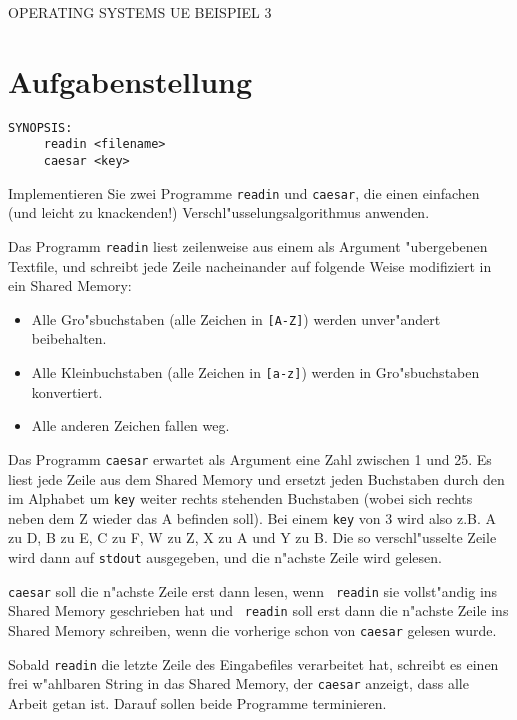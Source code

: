 \documentclass{article}
\begin{document}
\begin{center}
\begin{Large}
OPERATING SYSTEMS UE BEISPIEL 3
\end{Large}
\end{center}



\section*{Aufgabenstellung}

\begin{verbatim}
SYNOPSIS:
     readin <filename>
     caesar <key>
\end{verbatim} 

Implementieren Sie zwei Programme {\tt readin} und {\tt caesar}, die
einen einfachen (und leicht zu knackenden!)
Verschl"usselungsalgorithmus anwenden.

Das Programm {\tt readin} liest zeilenweise aus einem als Argument
"ubergebenen Textfile, und schreibt jede Zeile nacheinander auf
folgende Weise modifiziert in ein Shared Memory:
\begin{itemize}
\item Alle Gro"sbuchstaben (alle Zeichen in {\tt [A-Z]}) werden
unver"andert beibehalten.
\item Alle Kleinbuchstaben (alle Zeichen in {\tt [a-z]}) werden in
Gro"sbuchstaben konvertiert.
\item Alle anderen Zeichen fallen weg.
\end{itemize}
Das Programm {\tt caesar} erwartet als Argument eine Zahl zwischen 1
und 25. Es liest jede Zeile aus dem Shared Memory und ersetzt jeden
Buchstaben durch den im Alphabet um {\tt key} weiter rechts stehenden
Buchstaben (wobei sich rechts neben dem Z wieder das A befinden
soll). Bei einem {\tt key} von 3 wird also z.B. A zu D, B zu E, C zu
F, W zu Z, X zu A und Y zu B. Die so verschl"usselte Zeile wird dann
auf {\tt stdout} ausgegeben, und die n"achste Zeile wird gelesen.

{\tt caesar} soll die n"achste Zeile erst dann lesen, wenn {\tt
readin} sie vollst"andig ins Shared Memory geschrieben hat und {\tt
readin} soll erst dann die n"achste Zeile ins Shared Memory schreiben,
wenn die vorherige schon von {\tt caesar} gelesen wurde.

Sobald {\tt readin} die letzte Zeile des Eingabefiles verarbeitet hat,
schreibt es einen frei w"ahlbaren String in das Shared Memory, der
{\tt caesar} anzeigt, dass alle Arbeit getan ist. Darauf sollen beide
Programme terminieren.
\end{document}
